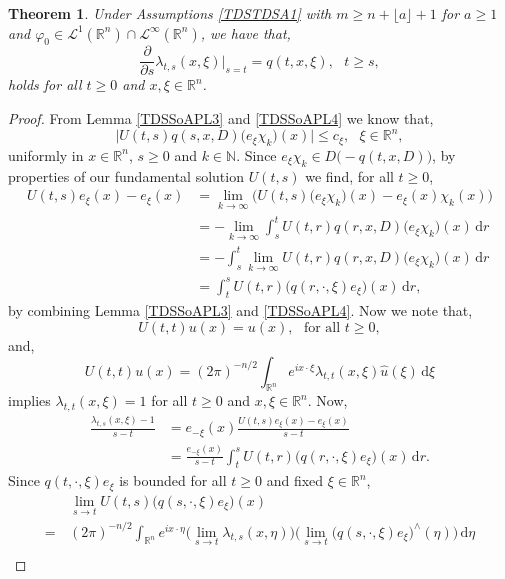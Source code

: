 \documentclass[a4paper, 12pt]{report}
\newtheorem{theorem}{Theorem}[section]
\theoremstyle{remark}
\theoremstyle{definition}
\begin{document}
\begin{theorem}\label{TDSSoAPT3}
Under Assumptions \ref{TDSTDSA1} with $m \ge n + \lfloor a \rfloor + 1$ for $a \ge 1$ and $\varphi_0 \in \mathcal{L}^1(\mathbb{R}^n) \cap \mathcal{L}^\infty(\mathbb{R}^n)$, we have that,
\begin{equation}
\frac{\partial}{\partial s}\lambda_{t, s}(x, \xi)\bigg|_{s = t} = q(t, x, \xi), \,\,\,\, t \ge s,
\end{equation}
holds for all $t \ge 0$ and $x, \xi \in \mathbb{R}^n$.
\end{theorem}
\begin{proof}
From Lemma \ref{TDSSoAPL3} and \ref{TDSSoAPL4} we know that,
$$
\big|U(t, s)q(s, x, D)\big(e_\xi\chi_k\big)(x)\big| \le c_\xi, \,\,\,\, \xi \in \mathbb{R}^n,
$$
uniformly in $x \in \mathbb{R}^n$, $s \ge 0$ and $k \in \mathbb{N}$.  Since $e_\xi\chi_k \in D\big(-q(t, x, D)\big)$, by properties of our fundamental solution $U(t, s)$ we find, for all $t \ge 0$,
$$
\begin{aligned}
U(t, s)e_\xi(x) - e_\xi(x) & = \lim_{k \to \infty}\big(U(t, s)\big(e_\xi\chi_k\big)(x) - e_\xi(x)\chi_k(x)\big)\\
& = -\lim_{k \to \infty}\int_s^tU(t, r)q(r, x, D)\big(e_\xi\chi_k\big)(x)\,\mathrm{d}r\\
& = -\int_s^t\lim_{k \to \infty}U(t, r)q(r, x, D)\big(e_\xi\chi_k\big)(x)\,\mathrm{d}r\\
& = \int_t^sU(t, r)\big(q(r, \cdot, \xi)e_\xi\big)(x)\,\mathrm{d}r,
\end{aligned}
$$
by combining Lemma \ref{TDSSoAPL3} and \ref{TDSSoAPL4}.  Now we note that,
$$
U(t, t)u(x) = u(x), \,\,\,\, \text{for all } t \ge 0,
$$
and,
$$
U(t, t)u(x) = (2\pi)^{-n/2}\int_{\mathbb{R}^n}e^{ix\cdot\xi}\lambda_{t, t}(x, \xi)\hat{u}(\xi)\,\mathrm{d}\xi
$$
implies $\lambda_{t, t}(x, \xi) = 1$ for all $t \ge 0$ and $x, \xi \in \mathbb{R}^n$.  Now,
$$
\begin{aligned}
\frac{\lambda_{t, s}(x, \xi) - 1}{s - t} & = e_{-\xi}(x)\frac{U(t, s)e_\xi(x) - e_\xi(x)}{s - t}\\
& = \frac{e_{-\xi}(x)}{s - t}\int_t^sU(t, r)\big(q(r, \cdot, \xi)e_\xi\big)(x)\,\mathrm{d}r.
\end{aligned}
$$
Since $q(t, \cdot, \xi)e_\xi$ is bounded for all $t \ge 0$ and fixed $\xi \in \mathbb{R}^n$, 
$$
\begin{aligned}
& \, \lim_{s \to t}U(t, s)\big(q(s, \cdot, \xi)e_\xi\big)(x)\\
= & \, (2\pi)^{-n/2}\int_{\mathbb{R}^n}e^{ix\cdot\eta}\Big(\lim_{s \to t}\lambda_{t, s}(x, \eta)\Big)\Big(\lim_{s \to t}\big(q(s, \cdot, \xi)e_\xi\big)^\wedge(\eta)\Big)\,\mathrm{d}\eta\\

\end{aligned}$$
\end{proof}
\end{document}
